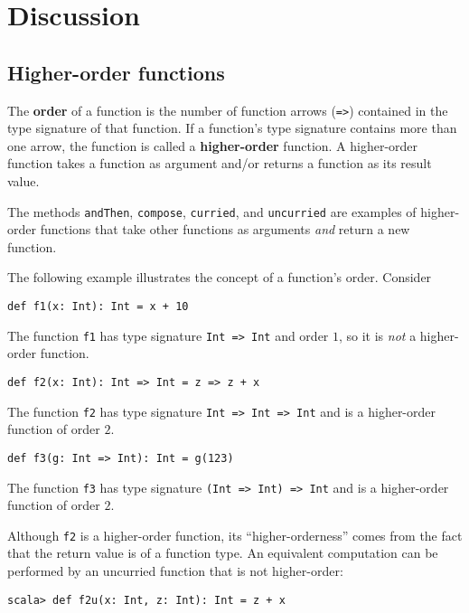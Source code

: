 \section{Discussion}

\subsection{Higher-order functions}

The \textbf{order} of a function is the
number of function arrows (\lstinline!=>!) contained in the type
signature of that function. If a function's type signature contains
more than one arrow, the function is called a \textbf{higher-order}
function. A higher-order function takes a function as argument and/or
returns a function as its result value.

The methods \lstinline!andThen!, \lstinline!compose!, \lstinline!curried!,
and \lstinline!uncurried! are examples of higher-order functions
that take other functions as arguments \emph{and} return a new function.

The following example illustrates the concept of a function's order.
Consider 
\begin{lstlisting}
def f1(x: Int): Int = x + 10
\end{lstlisting}
The function \texttt{}\lstinline!f1! has type signature \texttt{}\lstinline!Int => Int!
and order $1$, so it is \emph{not} a higher-order function.
\begin{lstlisting}
def f2(x: Int): Int => Int = z => z + x
\end{lstlisting}
The function \texttt{}\lstinline!f2! has type signature \texttt{}\lstinline!Int => Int => Int!
and is a higher-order function of order $2$. 
\begin{lstlisting}
def f3(g: Int => Int): Int = g(123)
\end{lstlisting}
The function \texttt{}\lstinline!f3! has type signature \texttt{}\lstinline!(Int => Int) => Int!
and is a higher-order function of order $2$.

Although \texttt{}\lstinline!f2! is a higher-order function, its
``higher-orderness'' comes from the fact that the return value is
of a function type. An equivalent computation can be performed by
an uncurried function that is not higher-order:
\begin{lstlisting}
scala> def f2u(x: Int, z: Int): Int = z + x
\end{lstlisting}


